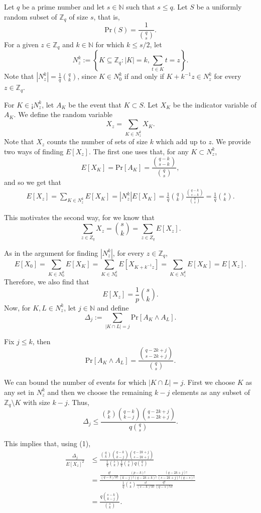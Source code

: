 Let $q$ be a prime number and let $s \in \mathbb{N}$ such that $s\leq q$. Let $S$ be a uniformly random subset of $\mathbb{Z}_q$ of size $s$, that is, 
\[\text{Pr}(S) = \frac{1}{{q \choose s}}.\]
For a given $z \in \mathbb{Z}_q$ and $k \in \mathbb{N}$ for which $k \leq s/2$, let 
\[N_z^k := \left\{K \subseteq \mathbb{Z}_q: |K| = k, \sum_{t \in K} t = z\right\}.\]
Note that $|N_z^k| = \frac{1}{q}{q \choose k}$, since $K \in N_0^k$ if and only if $K + k^{-1}z \in N_z^k$ for every $z \in \mathbb{Z}_q$.\par
For $K \in¡ N_z^k$, let $A_K$ be the event that $K \subset S$. Let $X_K$ be the indicator variable of $A_K$.
We define the random variable 
\[X_z = \sum_{K \in N_z^k} X_K.\]
Note that $X_z$ counts the number of sets of size $k$ which add up to $z$. We provide two ways of finding $E[X_z]$. The first one uses that, for any $K \subset N^k_z$, 
\[E[X_K] = \text{Pr}[A_K] = \frac{{q - k \choose s - k}}{{q \choose s}},\]
and so we get that
\begin{align*}
    E[X_z] = \sum_{K \in N_z^k} E[X_K] = |N_z^k|E[X_K] = \frac{1}{q}{q \choose k}\frac{{q - k \choose s - k}}{{q \choose s}} = \frac{1}{q} {s \choose k}.
\end{align*}
\par
This motivates the second way, for we know that 
\[\sum_{z \in Z_q} X_z = {s \choose k} = \sum_{z \in Z_q} E[X_z].\]\par
As in the argument for finding $|N_z^k|$, for every $z \in \mathbb{Z}_q$, 
\[E[X_0] = \sum_{K \in N_0^k}E[X_K] = \sum_{K \in N_0^k} E[X_{K + k^{-1}z}] = \sum_{K \in N_z^k} E[X_K] = E[X_z].\]
Therefore, we also find that
\begin{equation}
E[X_z] = \frac{1}{p} {s \choose k}.
\end{equation}
Now, for $K, L \in N_z^k$, let $j \in \mathbb{N}$ and define
\[\Delta_j := \sum_{|K \cap L| = j} \text{Pr}[A_K \land A_L].\]
\par Fix $j \leq k$, then 
\[\text{Pr}[A_K \land A_L] = \frac{{q - 2k + j \choose s - 2k + j}}{{q \choose s}}.\]
\par
We can bound the number of events for which $|K \cap L| = j$. First we choose $K$ as any set in $N_z^k$ and then we choose the remaining $k- j$ elements as any subset of $\mathbb{Z}_q \setminus K$ with size $k - j$. Thus, 
\[\Delta_j \leq \frac{{p \choose k} {q - k \choose k - j}{q - 2k + j \choose s - 2k + j}}{q{q \choose s}}.\]
\par This implies that, using (1),
\begin{align*}
    \frac{\Delta_j}{E[X_z]^2} &\leq \frac{{q \choose k} {q - k \choose k - j}{q - 2k + j \choose s - 2k + j}}{\frac{1}{q} {s \choose k}\frac{1}{q} {s \choose k}q{q \choose s}} \\
    &= \frac{\frac{q!}{(q - k)!k!}\frac{(p - k)!}{(k - j)!(q - 2k + k)!}\frac{(q - 2k + j)!}{(s - 2k + j)!(q - s)!}}{\frac{1}{q}{s \choose k}\frac{s!}{(s - k)!k!}\frac{q!}{(q - s)!s!}} \\
    &= \frac{q{s - k \choose k - j}}{{s \choose k}}.
\end{align*}
